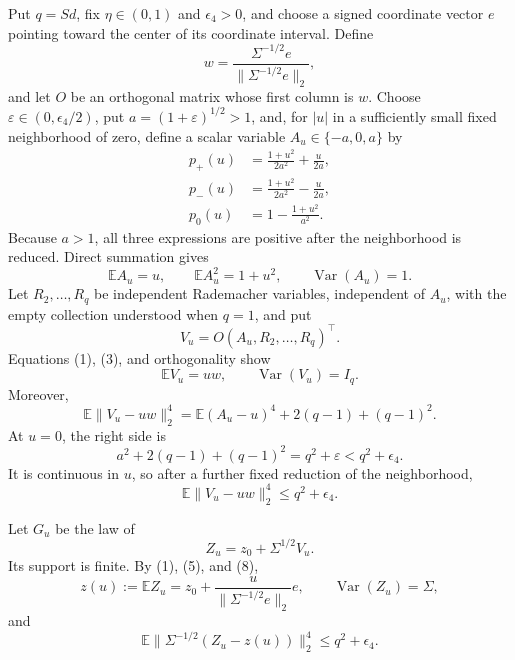 Put \(q=Sd\), fix \(\eta\in(0,1)\) and \(\epsilon_4>0\), and choose a signed coordinate vector \(e\) pointing toward the center of its coordinate interval.  Define
\[
 w=\frac{\Sigma^{-1/2}e}{\|\Sigma^{-1/2}e\|_2},            \tag{1}
\]
and let \(O\) be an orthogonal matrix whose first column is \(w\).  Choose
\(\varepsilon\in(0,\epsilon_4/2)\), put
\(a=(1+\varepsilon)^{1/2}>1\), and, for \(|u|\) in a sufficiently small fixed neighborhood of zero, define a scalar variable \(A_u\in\{-a,0,a\}\) by
\[
\begin{aligned}
 p_+(u)&=\frac{1+u^2}{2a^2}+\frac{u}{2a},\\
 p_-(u)&=\frac{1+u^2}{2a^2}-\frac{u}{2a},\\
 p_0(u)&=1-\frac{1+u^2}{a^2}.
\end{aligned}                                               \tag{2}
\]
Because \(a>1\), all three expressions are positive after the neighborhood is reduced.  Direct summation gives
\[
 \mathbb EA_u=u,
 \qquad \mathbb EA_u^2=1+u^2,
 \qquad \operatorname{Var}(A_u)=1.                         \tag{3}
\]
Let \(R_2,\ldots,R_q\) be independent Rademacher variables, independent of \(A_u\), with the empty collection understood when \(q=1\), and put
\[
 V_u=O(A_u,R_2,\ldots,R_q)^\top.                           \tag{4}
\]
Equations (1), (3), and orthogonality show
\[
 \mathbb EV_u=uw,
 \qquad \operatorname{Var}(V_u)=I_q.                       \tag{5}
\]
Moreover,
\[
 \mathbb E\|V_u-uw\|_2^4
 =\mathbb E(A_u-u)^4+2(q-1)+(q-1)^2.                       \tag{6}
\]
At \(u=0\), the right side is
\[
 a^2+2(q-1)+(q-1)^2=q^2+\varepsilon<q^2+\epsilon_4.        \tag{7}
\]
It is continuous in \(u\), so after a further fixed reduction of the neighborhood,
\[
 \mathbb E\|V_u-uw\|_2^4\le q^2+\epsilon_4.               \tag{8}
\]

Let \(G_u\) be the law of
\[
 Z_u=z_0+\Sigma^{1/2}V_u.                                  \tag{9}
\]
Its support is finite.  By (1), (5), and (8),
\[
 z(u):=\mathbb EZ_u
 =z_0+\frac{u}{\|\Sigma^{-1/2}e\|_2}e,
 \qquad \operatorname{Var}(Z_u)=\Sigma,                   \tag{10}
\]
and
\[
 \mathbb E\|\Sigma^{-1/2}(Z_u-z(u))\|_2^4
 \le q^2+\epsilon_4.                                      \tag{11}
\]

